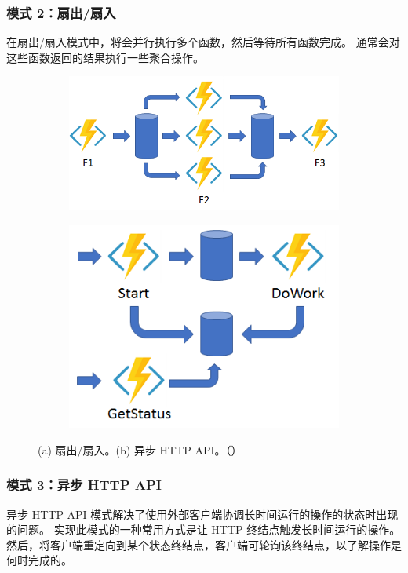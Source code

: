 \documentclass[11pt]{article}
\begin{document}
\subsubsection{模式 2：扇出/扇入}
在扇出/扇入模式中，将会并行执行多个函数，然后等待所有函数完成。 通常会对这些函数返回的结果执行一些聚合操作。
\begin{figure}[!htbp]
	\begin{subfigure}[b]{0.62\linewidth}
		\includegraphics[width=\linewidth]{figs/model2}
		\caption{}
	\end{subfigure}
	\begin{subfigure}[b]{0.38\linewidth}
		\includegraphics[width=\linewidth]{figs/model3}
		\caption{}
	\end{subfigure}
	\caption{(a) 扇出/扇入。(b) 异步 HTTP API。（\cite{Durable}）}
\end{figure}

\subsubsection{模式 3：异步 HTTP API}
异步 HTTP API 模式解决了使用外部客户端协调长时间运行的操作的状态时出现的问题。 实现此模式的一种常用方式是让 HTTP 终结点触发长时间运行的操作。 然后，将客户端重定向到某个状态终结点，客户端可轮询该终结点，以了解操作是何时完成的。
\end{document}
